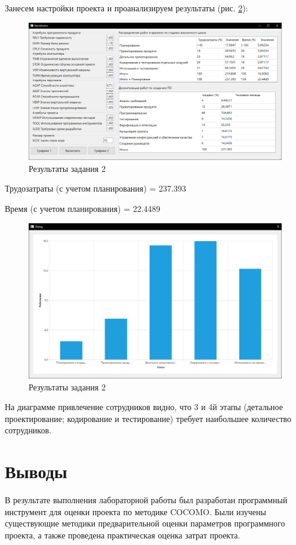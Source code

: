 Занесем настройки проекта и проанализируем результаты (рис. \ref{p5}):
\begin{figure}[!h]
	\centering
	\includegraphics[width=1\linewidth]{inc/img/4.png}
	\caption{Результаты задания 2}
	\label{p4}
\end{figure}

Трудозатраты (с учетом планирования) = 237.393

Время (с учетом планирования) = 22.4489

\newpage 
\begin{figure}[!h]
	\centering
	\includegraphics[width=1\linewidth]{inc/img/5.png}
	\caption{Результаты задания 2}
	\label{p5}
\end{figure}

На диаграмме привлечение сотрудников видно, что 3 и 4й этапы (детальное
проектирование; кодирование и тестирование) требует наибольшее количество
сотрудников.

\section*{Выводы}
В результате выполнения лабораторной работы был разработан
программный инструмент для оценки проекта по методике COCOMO. Были
изучены существующие методики предварительной оценки параметров
программного проекта, а также проведена практическая оценка затрат проекта.

